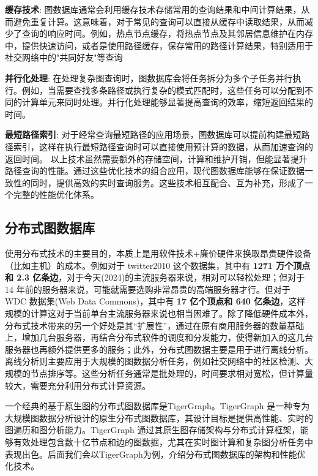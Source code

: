 \textbf{缓存技术}: 图数据库通常会利用缓存技术存储常用的查询结果和中间计算结果，从而避免重复计算。这意味着，对于常见的查询可以直接从缓存中读取结果，从而减少了查询的响应时间。例如，热点节点缓存，将热点节点及其邻居信息维护在内存中，提供快速访问，或者是使用路径缓存，保存常用的路径计算结果，特别适用于社交网络中的"共同好友"等查询


\textbf{并行化处理}: 在处理复杂图查询时，图数据库会将任务拆分为多个子任务并行执行。例如，当需要查找多条路径或执行复杂的模式匹配时，这些任务可以分配到不同的计算单元来同时处理。并行化处理能够显著提高查询的效率，缩短返回结果的时间。

\textbf{最短路径索引}: 对于经常查询最短路径的应用场景，图数据库可以提前构建最短路径索引，这样在执行最短路径查询时可以直接使用预计算的数据，从而加速查询的返回时间。
以上技术虽然需要额外的存储空间，计算和维护开销，但能显著提升路径查询的性能。通过这些优化技术的组合应用，现代图数据库能够在保证数据一致性的同时，提供高效的实时查询服务。这些技术相互配合、互为补充，形成了一个完整的性能优化体系。


\subsection{分布式图数据库}

使用分布式技术的主要目的，本质上是用软件技术+廉价硬件来换取昂贵硬件设备（比如主机）的成本。例如对于 twitter2010 这个数据集，其中有 \textbf{1271 万个顶点和 2.3 亿条边}，对于今天(2024)的主流服务器来说，相对可以轻松处理；但对于 14 年前的服务器来说，可能就需要选购非常昂贵的高端服务器才行。但对于 WDC 数据集(Web Data Commons)，其中有 \textbf{17 亿个顶点和 640 亿条边}，这样规模的计算这对于当前单台主流服务器来说也相当困难了。除了降低硬件成本外，分布式技术带来的另一个好处是其“扩展性”，通过在原有商用服务器的数量基础上，增加几台服务器，再结合分布式软件的调度和分发能力，使得新加入的这几台服务器也再额外提供更多的服务；此外，分布式图数据主要是用于进行离线分析。离线分析则主要应用于大规模的图数据分析任务，例如社交网络中的社区检测、大规模的节点排序等。这些分析任务通常是批处理的，时间要求相对宽松，但计算量较大，需要充分利用分布式计算资源。

一个经典的基于原生图的分布式图数据库是TigerGraph。TigerGraph 是一种专为大规模图数据分析设计的原生分布式图数据库，其设计目标是提供高性能、实时的图遍历和图分析能力。TigerGraph 通过其原生图存储架构与分布式计算框架，能够有效处理包含数十亿节点和边的图数据，尤其在实时图计算和复杂图分析任务中表现出色。后面我们会以TigerGraph为例，介绍分布式图数据库的架构和性能优化技术。

